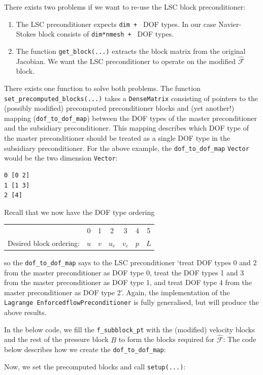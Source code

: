 There exists two problems if we want to re-use the LSC block preconditioner:
\begin{enumerate}
\item The LSC preconditioner expects \texttt{dim \allowbreak + }
  DOF types. In our case Navier-Stokes block consists of \texttt{dim*nmesh
    \allowbreak + } DOF types.
\item The function \texttt{get\_\allowbreak block(...)} extracts the block
  matrix from the original Jacobian. We want the LSC preconditioner to operate
  on the modified $\hat{\mathcal{F}}$ block.
\end{enumerate}
There exists one function to solve both problems. The function
\texttt{set\_\allowbreak precomputed\_\allowbreak blocks(...)} takes a
\texttt{Dense\allowbreak Matrix} consisting of pointers to the (possibly
modified) precomputed preconditioner blocks and (yet another!) mapping
(\texttt{dof\_\allowbreak to\_\allowbreak dof\_\allowbreak map}) between the
DOF types of the master preconditioner and the subsidiary preconditioner. This
mapping describes which DOF type of the master preconditioner should be treated
as a single DOF type in the subsidiary preconditioner.  For the above example,
the \texttt{dof\_\allowbreak to\_\allowbreak dof\_\allowbreak map}
\texttt{Vector} would be the two dimension \texttt{Vector}:
\begin{verbatim}
0 [0 2]
1 [1 3]
2 [4]
\end{verbatim}
Recall that we now have the DOF type ordering
\begin{center}
    \begin{tabular}{ | r | c c c c c c |}
    \hline
                        & 0   &  1  &  2  &   3    &   4   &  5  \\ 
Desired block ordering: & $u$ & $v$ & $u_c$ & $v_c$& $p$   & $L$ \\ 
    \hline
    \end{tabular}
\end{center}
so the \texttt{dof\_\allowbreak to\_\allowbreak dof\_\allowbreak map} says to
the LSC preconditioner `treat DOF types 0 and 2 from the master preconditioner
as DOF type 0, treat the DOF types 1 and 3 from the master preconditioner as
DOF type 1, and treat DOF type 4 from the master preconditioner as DOF type 2'.
Again, the implementation of the \texttt{Lagrange\allowbreak
  Enforcedflow\allowbreak Preconditioner} is fully generalised, but will
produce the above results.

In the below code, we fill the \texttt{f\_\allowbreak subblock\_\allowbreak pt} with the (modified) velocity blocks and the rest of the pressure block $B$ to form the blocks required for $\hat{\mathcal{F}}$:
The code below describes how we create the \texttt{dof\_\allowbreak to\_\allowbreak dof\_\allowbreak map}:

Now, we set the precomputed blocks and call \texttt{setup(...)}:



